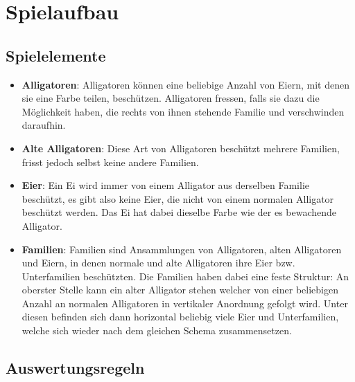 \section{Spielaufbau}

\subsection{Spielelemente}

	\begin{itemize}

		\item \textbf{Alligatoren}: Alligatoren können eine beliebige Anzahl von Eiern, mit denen sie eine Farbe teilen, beschützen.
		Alligatoren fressen, falls sie dazu die Möglichkeit haben, die rechts von ihnen stehende Familie und verschwinden daraufhin.
	
		\item \textbf{Alte Alligatoren}: Diese Art von Alligatoren beschützt mehrere Familien, frisst jedoch selbst keine andere Familien.

		\item \textbf{Eier}: Ein Ei wird immer von einem Alligator aus derselben Familie beschützt, es gibt also keine Eier, die nicht von einem normalen Alligator beschützt werden.
		Das Ei hat dabei dieselbe Farbe wie der es bewachende Alligator.

		\item \textbf{Familien}: Familien sind Ansammlungen von Alligatoren, alten Alligatoren und Eiern, in denen normale und alte Alligatoren ihre Eier bzw. Unterfamilien beschützten.
		Die Familien haben dabei eine feste Struktur: An oberster Stelle kann ein alter Alligator stehen welcher von einer beliebigen Anzahl an normalen Alligatoren in vertikaler Anordnung gefolgt wird.
		Unter diesen befinden sich dann horizontal beliebig viele Eier und Unterfamilien, welche sich wieder nach dem gleichen Schema zusammensetzen.

	\end{itemize}

\subsection{Auswertungsregeln}


